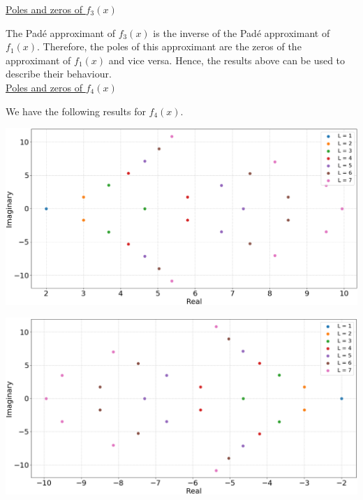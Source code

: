 \documentclass[12pt, a4paper]{article}
\begin{document}
\vspace{0.4cm}
\underline{Poles and zeros of $f_{3}(x)$}

\vspace{0.5cm}
The Pad\'e approximant of $f_{3}(x)$ is the inverse of the Pad\'e approximant of $f_{1}(x)$. Therefore, the
poles of this approximant are the zeros of the approximant of $f_{1}(x)$ and vice versa. Hence, the results
above can be used to describe their behaviour.
\\

\vspace{0.4cm}
\underline{Poles and zeros of $f_{4}(x)$}

\vspace{0.5cm}
We have the following results for $f_{4}(x)$.

\vspace{0.3cm}
\begin{minipage}{\textwidth}
	\includegraphics[width=\linewidth]{q5_fig1_poles}
	\label{q5_fig1_poles}
\end{minipage}
\vspace{0.1cm}

\vspace{0.3cm}
\begin{minipage}{\textwidth}
	\includegraphics[width=\linewidth]{q5_fig1_zeros}
	\label{q5_fig1_zeros}
\end{minipage}
\vspace{0.1cm}
\end{document}
